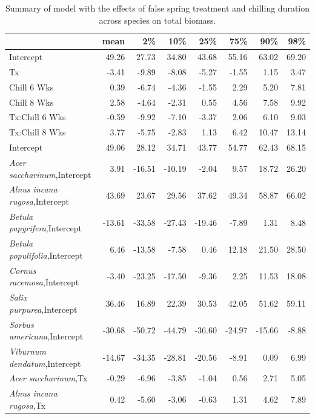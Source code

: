 \documentclass{article}\usepackage[]{graphicx}\usepackage[]{color}
\begin{document}
\newpage
\begin{longtable}{lrrrrrrr}
\caption{Summary of model with the effects of false spring treatment and chilling duration across species on total biomass.} \\ 
  \hline
 & mean & 2\% & 10\% & 25\% & 75\% & 90\% & 98\% \\ 
  \hline \endhead  \hline
Intercept & 49.26 & 27.73 & 34.80 & 43.68 & 55.16 & 63.02 & 69.20 \\ 
  Tx & -3.41 & -9.89 & -8.08 & -5.27 & -1.55 & 1.15 & 3.47 \\ 
  Chill 6 Wks & 0.39 & -6.74 & -4.36 & -1.55 & 2.29 & 5.20 & 7.81 \\ 
  Chill 8 Wks & 2.58 & -4.64 & -2.31 & 0.55 & 4.56 & 7.58 & 9.92 \\ 
  Tx:Chill 6 Wks & -0.59 & -9.92 & -7.10 & -3.37 & 2.06 & 6.10 & 9.03 \\ 
  Tx:Chill 8 Wks & 3.77 & -5.75 & -2.83 & 1.13 & 6.42 & 10.47 & 13.14 \\ 
  Intercept & 49.06 & 28.12 & 34.71 & 43.77 & 54.77 & 62.43 & 68.15 \\ 
  \textit{Acer saccharinum},Intercept & 3.91 & -16.51 & -10.19 & -2.04 & 9.57 & 18.72 & 26.20 \\ 
  \textit{Alnus incana rugosa},Intercept & 43.69 & 23.67 & 29.56 & 37.62 & 49.34 & 58.87 & 66.02 \\ 
  \textit{Betula papyrifera},Intercept & -13.61 & -33.58 & -27.43 & -19.46 & -7.89 & 1.31 & 8.48 \\ 
  \textit{Betula populifolia},Intercept & 6.46 & -13.58 & -7.58 & 0.46 & 12.18 & 21.50 & 28.50 \\ 
  \textit{Cornus racemosa},Intercept & -3.40 & -23.25 & -17.50 & -9.36 & 2.25 & 11.53 & 18.08 \\ 
  \textit{Salix purpurea},Intercept & 36.46 & 16.89 & 22.39 & 30.53 & 42.05 & 51.62 & 59.11 \\ 
  \textit{Sorbus americana},Intercept & -30.68 & -50.72 & -44.79 & -36.60 & -24.97 & -15.66 & -8.88 \\ 
  \textit{Viburnum dendatum},Intercept & -14.67 & -34.35 & -28.81 & -20.56 & -8.91 & 0.09 & 6.99 \\ 
  \textit{Acer saccharinum},Tx & -0.29 & -6.96 & -3.85 & -1.04 & 0.56 & 2.71 & 5.05 \\ 
  \textit{Alnus incana rugosa},Tx & 0.42 & -5.60 & -3.06 & -0.63 & 1.31 & 4.62 & 7.89 \\ 

\end{longtable}
\end{document}
